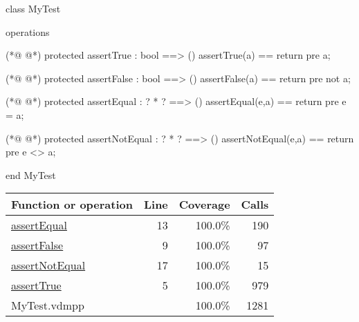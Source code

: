 \begin{vdmpp}[breaklines=true]
class MyTest

operations

(*@
\label{assertTrue:5}
@*)
 protected assertTrue : bool ==> ()
  assertTrue(a) == return
  pre a;
 
(*@
\label{assertFalse:9}
@*)
 protected assertFalse : bool ==> ()
  assertFalse(a) == return
  pre not a;
 
(*@
\label{assertEqual:13}
@*)
 protected assertEqual : ? * ? ==> ()
 assertEqual(e,a) == return
 pre e = a;
 
(*@
\label{assertNotEqual:17}
@*)
 protected assertNotEqual : ? * ? ==> ()
 assertNotEqual(e,a) == return
 pre e <> a;

end MyTest
\end{vdmpp}
\bigskip
\begin{longtable}{|l|r|r|r|}
\hline
Function or operation & Line & Coverage & Calls \\
\hline
\hline
\hyperref[assertEqual:13]{assertEqual} & 13&100.0\% & 190 \\
\hline
\hyperref[assertFalse:9]{assertFalse} & 9&100.0\% & 97 \\
\hline
\hyperref[assertNotEqual:17]{assertNotEqual} & 17&100.0\% & 15 \\
\hline
\hyperref[assertTrue:5]{assertTrue} & 5&100.0\% & 979 \\
\hline
\hline
MyTest.vdmpp & & 100.0\% & 1281 \\
\hline
\end{longtable}

